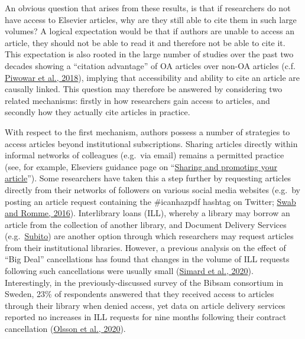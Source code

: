 \documentclass[
]{article}
\begin{document}
An obvious question that arises from these results, is that if researchers do not have access to Elsevier articles, why are they still able to cite them in such large volumes? A logical expectation would be that if authors are unable to access an article, they should not be able to read it and therefore not be able to cite it. This expectation is also rooted in the large number of studies over the past two decades showing a ``citation advantage'' of OA articles over non-OA articles (c.f. \href{https://doi.org/10.7717/peerj.4375}{Piwowar et al., 2018}), implying that accessibility and ability to cite an article are causally linked. This question may therefore be answered by considering two related mechanisms: firstly in how researchers gain access to articles, and secondly how they actually cite articles in practice.

With respect to the first mechanism, authors possess a number of strategies to access articles beyond institutional subscriptions. Sharing articles directly within informal networks of colleagues (e.g.~via email) remains a permitted practice (see, for example, Elsevier\textquotesingle s guidance page on ``\href{https://www.elsevier.com/authors/submit-your-paper/sharing-and-promoting-your-article}{Sharing and promoting your article}''). Some researchers have taken this a step further by requesting articles directly from their networks of followers on various social media websites (e.g.~by posting an article request containing the \#icanhazpdf hashtag on Twitter; \href{https://doi.org/10.5596/c16-009}{Swab and Romme, 2016}). Interlibrary loans (ILL), whereby a library may borrow an article from the collection of another library, and Document Delivery Services (e.g.~\href{https://www.subito-doc.de/?lang=en}{Subito}) are another option through which researchers may request articles from their institutional libraries. However, a previous analysis on the effect of ``Big Deal'' cancellations has found that changes in the volume of ILL requests following such cancellations were usually small (\href{https://arxiv.org/abs/2009.04287}{Simard et al., 2020}). Interestingly, in the previously-discussed survey of the Bibsam consortium in Sweden, 23\% of respondents answered that they received access to articles through their library when denied access, yet data on article delivery services reported no increases in ILL requests for nine months following their contract cancellation (\href{http://doi.org/10.1629/uksg.507}{Olsson et al., 2020}).
\end{document}
